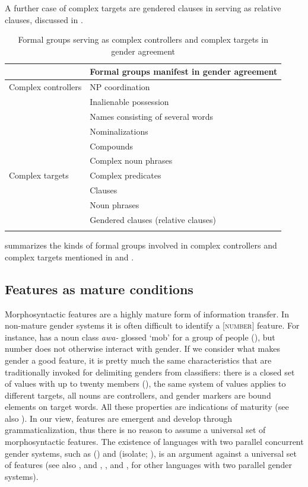 \documentclass[output=collectionpaper]{langsci/langscibook}
\begin{document}
A further case of complex targets are gendered clauses in  serving as relative clauses, discussed in .

\begin{table}[htb]
  \caption{Formal groups serving as complex controllers and complex targets in gender agreement}
\begin{tabular}{ll}
\lsptoprule
&	Formal groups manifest in gender agreement	\\
\midrule
Complex controllers	&	NP coordination	\\
&	Inalienable possession	\\
&	Names consisting of several words	\\
&	Nominalizations	\\
&	Compounds	\\
&	Complex noun phrases	\\
Complex targets	&	Complex predicates	\\
&	Clauses	\\
&	Noun phrases	\\
&	Gendered clauses (relative clauses)	\\
\lspbottomrule
\end{tabular}
\label{tab:WDG:16}
\end{table}

 summarizes the kinds of formal groups involved in complex controllers and complex targets mentioned in  and .

  \subsection{Features as mature conditions}
\label{sec:WDG:7.5}

Morphosyntactic features are a highly mature form of information transfer. In non-mature gender systems it is often difficult to identify a [\textsc{number}] feature. For instance,  has a noun class \textit{awa-} glossed `mob' for a group of people (\citealt[296]{Reid1990}), but number does not otherwise interact with gender. If we consider what makes gender a good feature, it is pretty much the same characteristics that are traditionally invoked for delimiting genders from classifiers: there is a closed set of values with up to twenty members (\citealt[215]{Dixon1982}), the same system of values applies to different targets, all nouns are controllers, and gender markers are bound elements on target words. All these properties are indications of maturity (see also ). In our view, features are emergent and develop through grammaticalization, thus there is no reason to assume a universal set of morphosyntactic features. The existence of languages with two parallel concurrent gender systems, such as  (\citealt{Aikhenvald2010}) and  (isolate; \citealt{Donohue2001}), is an argument against a universal set of features (see also \citealt{Dahl2000}, \citealt[252]{Corbett2017} and , , and , for other languages with two parallel gender systems).
\end{document}
